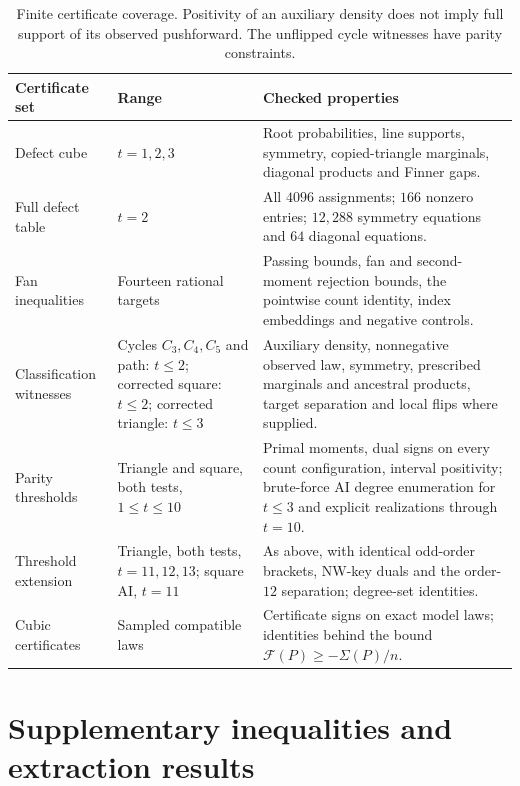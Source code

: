 \documentclass[11pt]{article}
\theoremstyle{plain}
\theoremstyle{definition}
\begin{document}
\begin{table}[!htbp]
\centering\small
\renewcommand{\arraystretch}{1.12}
\begin{tabular}{@{}>{\raggedright\arraybackslash}p{.21\linewidth}>{\raggedright\arraybackslash}p{.23\linewidth}>{\raggedright\arraybackslash}p{.48\linewidth}@{}}
\toprule
Certificate set & Range & Checked properties\\
\midrule
Defect cube & $t=1,2,3$ & Root probabilities, line supports, symmetry, copied-triangle marginals, diagonal products and Finner gaps.\\[3pt]
Full defect table & $t=2$ & All $4096$ assignments; $166$ nonzero entries; $12{,}288$ symmetry equations and $64$ diagonal equations.\\[3pt]
Fan inequalities & Fourteen rational targets & Passing bounds, fan and second-moment rejection bounds, the pointwise count identity, index embeddings and negative controls.\\[3pt]
Classification witnesses & Cycles $C_3,C_4,C_5$ and path: $t\le2$; corrected square: $t\le2$; corrected triangle: $t\le3$ & Auxiliary density, nonnegative observed law, symmetry, prescribed marginals and ancestral products, target separation and local flips where supplied.\\[3pt]
Parity thresholds & Triangle and square, both tests, $1\le t\le10$ & Primal moments, dual signs on every count configuration, interval positivity; brute-force AI degree enumeration for $t\le3$ and explicit realizations through $t=10$.\\[3pt]
Threshold extension & Triangle, both tests, $t=11,12,13$; square AI, $t=11$ & As above, with identical odd-order brackets, NW-key duals and the order-$12$ separation; degree-set identities.\\[3pt]
Cubic certificates & Sampled compatible laws & Certificate signs on exact model laws; identities behind the bound $\mathcal F(P)\ge-\Sigma(P)/n$.\\
\bottomrule
\end{tabular}
\caption{Finite certificate coverage. Positivity of an auxiliary density does not imply full support of its observed pushforward. The unflipped cycle witnesses have parity constraints.}\label{tab:verification}
\end{table}

\providecommand{\Csq}{\mathcal C_{\square}}
\providecommand{\Cpar}{\mathcal C_{\mathrm{par}}}
\providecommand{\Par}[3]{\Pi(#1,#2,#3)}
\section{Supplementary inequalities and extraction results}\label{app:supporting}
\end{document}
